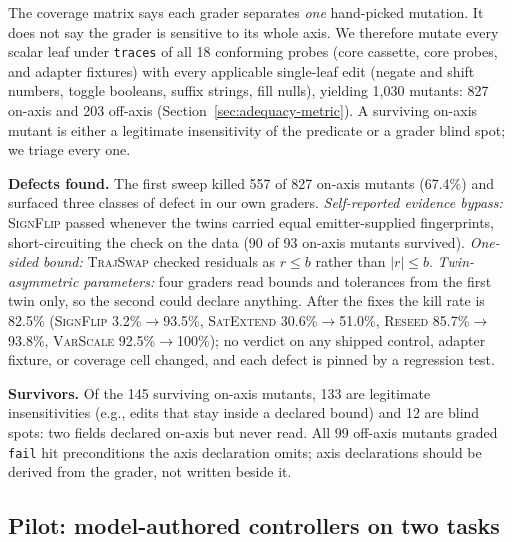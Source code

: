\documentclass[conference]{IEEEtran}
\begin{document}
	The coverage matrix says each grader separates \emph{one} hand-picked
	mutation. It does not say the grader is sensitive to its whole axis. We
	therefore mutate every scalar leaf under \texttt{traces} of all 18
	conforming probes (core cassette, core probes, and adapter fixtures) with
	every applicable single-leaf edit (negate and shift numbers, toggle
	booleans, suffix strings, fill nulls), yielding 1{,}030 mutants: 827
	on-axis and 203 off-axis (Section~\ref{sec:adequacy-metric}). A surviving
	on-axis mutant is either a legitimate insensitivity of the predicate or a
	grader blind spot; we triage every one.
	
	\textbf{Defects found.} The first sweep killed 557 of 827 on-axis mutants
	(67.4\%) and surfaced three classes of defect in our own graders.
	\emph{Self-reported evidence bypass:} \textsc{SignFlip} passed whenever
	the twins carried equal emitter-supplied fingerprints, short-circuiting
	the check on the data (90 of 93 on-axis mutants survived).
	\emph{One-sided bound:} \textsc{TrajSwap} checked residuals as $r \le b$
	rather than $|r| \le b$. \emph{Twin-asymmetric parameters:} four graders
	read bounds and tolerances from the first twin only, so the second could
	declare anything. After the fixes the kill rate is 82.5\%
	(\textsc{SignFlip} 3.2\%$\to$93.5\%, \textsc{SatExtend}
	30.6\%$\to$51.0\%, \textsc{Reseed} 85.7\%$\to$93.8\%, \textsc{VarScale}
	92.5\%$\to$100\%); no verdict on any shipped control, adapter fixture, or
	coverage cell changed, and each defect is pinned by a regression test.
	
	\textbf{Survivors.} Of the 145 surviving on-axis mutants, 133 are
	legitimate insensitivities (e.g., edits that stay inside a declared
	bound) and 12 are blind spots: two fields declared on-axis but never
	read. All 99 off-axis mutants graded \texttt{fail} hit preconditions the
	axis declaration omits; axis declarations should be derived from the
	grader, not written beside it.
	
	\subsection{Pilot: model-authored controllers on two tasks}
	\label{sec:pilot}
	
\end{document}
